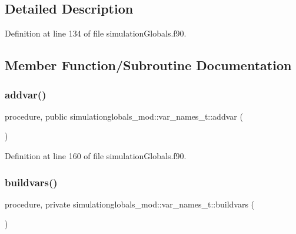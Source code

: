 \subsection{Detailed Description}


Definition at line 134 of file simulation\+Globals.\+f90.



\subsection{Member Function/\+Subroutine Documentation}
\mbox{\label{structsimulationglobals__mod_1_1var__names__t_ad8f0446f28faf00796d4952116484509}} 
\subsubsection{\texorpdfstring{addvar()}{addvar()}}
{\footnotesize\ttfamily procedure, public simulationglobals\+\_\+mod\+::var\+\_\+names\+\_\+t\+::addvar (\begin{DoxyParamCaption}{ }\end{DoxyParamCaption})}



Definition at line 160 of file simulation\+Globals.\+f90.

\mbox{\label{structsimulationglobals__mod_1_1var__names__t_a9a30996df58e3c94b86e6661291f4305}} 
\subsubsection{\texorpdfstring{buildvars()}{buildvars()}}
{\footnotesize\ttfamily procedure, private simulationglobals\+\_\+mod\+::var\+\_\+names\+\_\+t\+::buildvars (\begin{DoxyParamCaption}{ }\end{DoxyParamCaption})\hspace{0.3cm}{\ttfamily [private]}}




